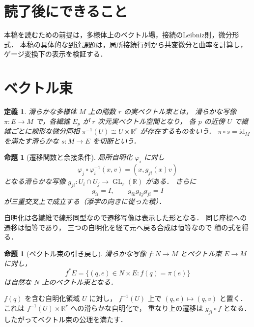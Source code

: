 \documentclass[a5paper,10pt,onecolumn]{jsarticle}
\makeatletter
\theoremstyle{mathnotetheorem}
\newtheorem{definition}[theorem]{定義}
\newtheorem{proposition}[theorem]{命題}
\renewcommand{\proofname}{証明}
\renewenvironment{proof}[1][\proofname]{%
  \par\pushQED{\qed}\normalfont\topsep4\p@\@plus2\p@\relax
  \trivlist\item[\hskip\labelsep\bfseries #1]\ignorespaces
}{\popQED\endtrivlist\@endpefalse}
\makeatother
\begin{document}
\section*{読了後にできること}
本稿を読むための前提は，多様体上のベクトル場，接続のLeibniz則，微分形式．
本稿の具体的な到達課題は，局所接続行列から共変微分と曲率を計算し，ゲージ変換下の表示を検証する．


\section{ベクトル束}
\begin{definition}
滑らかな多様体 $M$ 上の階数 $r$ の実ベクトル束とは，
滑らかな写像 $\pi:E\to M$ で，各繊維 $E_p$ が
$r$ 次元実ベクトル空間となり，
各 $p$ の近傍 $U$ で繊維ごとに線形な微分同相
$\pi^{-1}(U)\cong U\times\mathbb R^r$
が存在するものをいう．
$\pi\circ s=\mathrm{id}_M$ を満たす滑らかな
$s:M\to E$ を切断という．
\end{definition}
\begin{proposition}[遷移関数と余接条件]
局所自明化 $\varphi_i$ に対し
\[
 \varphi_j\circ\varphi_i^{-1}(x,v)
 =(x,g_{ji}(x)v)
\]
となる滑らかな写像
$g_{ji}:U_i\cap U_j\to\operatorname{GL}_r(\mathbb R)$ がある．
さらに
\[
 g_{ii}=I,\qquad
 g_{ik}g_{kj}g_{ji}=I
\]
が三重交叉上で成立する（添字の向きに従った積）．
\end{proposition}
\begin{proof}
自明化は各繊維で線形同型なので遷移写像は表示した形となる．
同じ座標への遷移は恒等であり，
三つの自明化を経て元へ戻る合成は恒等なので
積の式を得る．
\end{proof}
\begin{proposition}[ベクトル束の引き戻し]
滑らかな写像 $f:N\to M$ とベクトル束 $E\to M$ に対し，
\[
 f^*E=\{(q,e)\in N\times E:f(q)=\pi(e)\}
\]
は自然な $N$ 上のベクトル束となる．
\end{proposition}
\begin{proof}
$f(q)$ を含む自明化領域 $U$ に対し，
$f^{-1}(U)$ 上で $(q,e)\mapsto(q,v)$ と置く．
これは $f^{-1}(U)\times\mathbb R^r$ への滑らかな自明化で，
重なり上の遷移は $g_{ji}\circ f$ となる．
したがってベクトル束の公理を満たす．
\end{proof}
\end{document}
